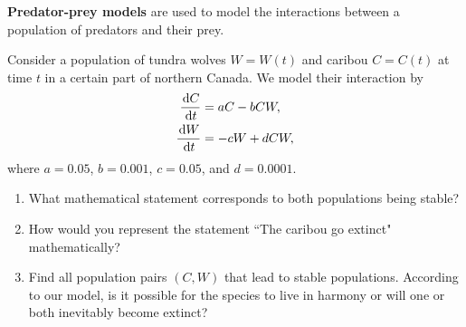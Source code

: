 \begin{remark}
\textbf{Predator-prey models} are used to model the interactions between a population of predators and their prey.
\end{remark}
\begin{example}
Consider a population of tundra wolves $W=W(t)$ and caribou $C=C(t)$ at time $t$ in a certain part of northern Canada.
We model their interaction by
\begin{align*}
\frac{\mkern 2mu \mathrm{d} C}{\mkern 2mu \mathrm{d} t} &= aC-bCW,\\
\frac{\mkern 2mu \mathrm{d} W}{\mkern 2mu \mathrm{d} t}&=-cW+dCW,
\end{align*}
where $a=0.05$, $b=0.001$, $c=0.05$, and $d=0.0001$.
\begin{enumerate}[label=(\alph*)]
\item What mathematical statement corresponds to both populations being stable?
\vfill
\item How would you represent the statement ``The caribou go extinct" mathematically?
\vfill
\item Find all population pairs $(C,W)$ that lead to stable populations.
According to our model, is it possible for the species to live in harmony or will one or both inevitably become extinct?
\vfill\vfill\vfill\vfill
\end{enumerate}
\end{example}
